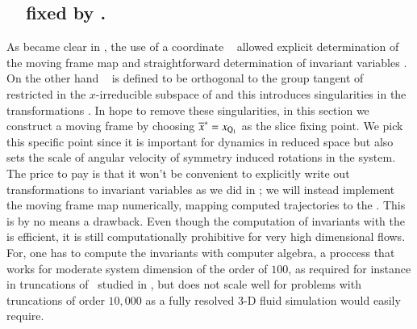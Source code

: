 
\subsection{\label{s:mfReqb}\CLe\ \slice\ fixed by \reqv.}

As became clear in , the use of a coordinate \slice\ 
allowed explicit determination of the moving frame map  and straightforward
determination of invariant variables .
On the other hand \slice\  is defined to be orthogonal
to the group tangent of  restricted in the $x$-irreducible subspace of 
and this introduces singularities in the transformations .
In hope to remove these singularities, in this section we construct a moving frame 
by choosing ${\overline{x}^*}=x_{\mathrm{Q}_{1}}$ as the slice fixing point. We pick this
specific point since it is important for dynamics in reduced space but also sets the
scale of angular velocity of symmetry induced rotations in the system.
The price to pay is that it won't be convenient to explicitly write out 
transformations to invariant variables
as we did in ; we will instead implement the moving frame map numerically,
mapping computed trajectories to the \slice.
This is by no means a drawback. Even though the computation of invariants with the
{\mframes} is efficient, it is still computationally
prohibitive for very high dimensional flows. For, one has
to compute the invariants with computer algebra, a proccess
that works for moderate system dimension of the order of $100$,
as required for instance in truncations of \KSe\ studied in ,
but does not scale well for problems with truncations of order $10,000$ as
a fully resolved $3$-D fluid simulation would easily require.


